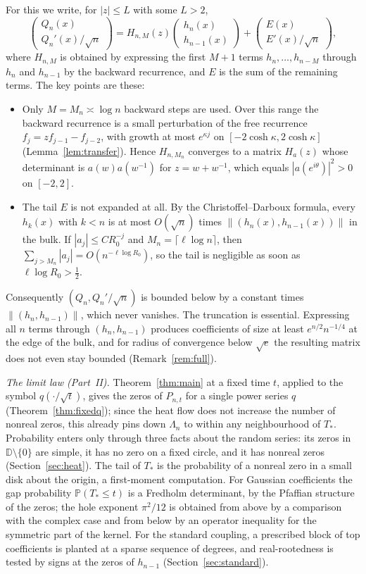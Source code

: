 \documentclass[11pt]{amsart}
\theoremstyle{definition}
\theoremstyle{remark}
\numberwithin{equation}{section}
\newcommand{\D}{\mathbb{D}}
\newcommand{\PP}{\mathbb{P}}
\begin{document}
For this we write, for $|z|\le L$ with some $L>2$,
\[
\begin{pmatrix}Q_n(x)\\ Q_n'(x)/\sqrt n\end{pmatrix}=H_{n,M}(z)\begin{pmatrix}h_n(x)\\ h_{n-1}(x)\end{pmatrix}+\begin{pmatrix}E(x)\\ E'(x)/\sqrt n\end{pmatrix},
\]
where $H_{n,M}$ is obtained by expressing the first $M+1$ terms $h_n,\dots,h_{n-M}$ through $h_n$ and $h_{n-1}$ by the backward recurrence, and $E$ is the sum of the remaining terms. The key points are these:
\begin{itemize}
\item Only $M=M_n\asymp\log n$ backward steps are used. Over this range the backward recurrence is a small perturbation of the free recurrence $f_j=zf_{j-1}-f_{j-2}$, with growth at most $e^{\kappa j}$ on $[-2\cosh\kappa,2\cosh\kappa]$ (Lemma~\ref{lem:transfer}). Hence $H_{n,M_n}$ converges to a matrix $H_a(z)$ whose determinant is $a(w)a(w^{-1})$ for $z=w+w^{-1}$, which equals $|a(e^{i\theta})|^2>0$ on $[-2,2]$.
\item The tail $E$ is not expanded at all. By the Christoffel--Darboux formula, every $h_k(x)$ with $k<n$ is at most $O(\sqrt n)$ times $\|(h_n(x),h_{n-1}(x))\|$ in the bulk. If $|a_j|\le CR_0^{-j}$ and $M_n=\lceil\ell\log n\rceil$, then $\sum_{j>M_n}|a_j|=O(n^{-\ell\log R_0})$, so the tail is negligible as soon as $\ell\log R_0>\frac12$.
\end{itemize}
Consequently $(Q_n,Q_n'/\sqrt n)$ is bounded below by a constant times $\|(h_n,h_{n-1})\|$, which never vanishes. The truncation is essential. Expressing all $n$ terms through $(h_n,h_{n-1})$ produces coefficients of size at least $e^{n/2}n^{-1/4}$ at the edge of the bulk, and for radius of convergence below $\sqrt e$ the resulting matrix does not even stay bounded (Remark~\ref{rem:full}).

\emph{The limit law (Part~II).} Theorem~\ref{thm:main} at a fixed time $t$, applied to the symbol $q(\cdot/\sqrt t)$, gives the zeros of $P_{n,t}$ for a single power series $q$ (Theorem~\ref{thm:fixedq}); since the heat flow does not increase the number of nonreal zeros, this already pins down $\Lambda_n$ to within any neighbourhood of $T_*$. Probability enters only through three facts about the random series: its zeros in $\D\setminus\{0\}$ are simple, it has no zero on a fixed circle, and it has nonreal zeros (Section~\ref{sec:heat}). The tail of $T_*$ is the probability of a nonreal zero in a small disk about the origin, a first-moment computation. For Gaussian coefficients the gap probability $\PP(T_*\le t)$ is a Fredholm determinant, by the Pfaffian structure of the zeros; the hole exponent $\pi^2/12$ is obtained from above by a comparison with the complex case and from below by an operator inequality for the symmetric part of the kernel. For the standard coupling, a prescribed block of top coefficients is planted at a sparse sequence of degrees, and real-rootedness is tested by signs at the zeros of $h_{n-1}$ (Section~\ref{sec:standard}).
\end{document}
